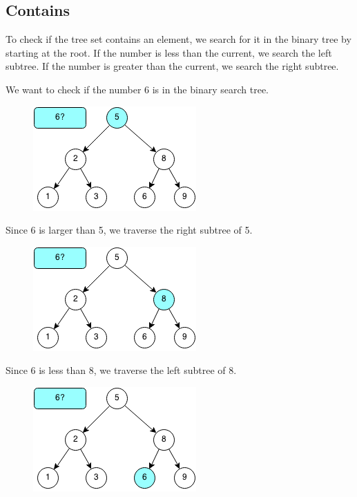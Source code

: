 \documentclass[11pt,oneside]{book}
\makeatletter
\def\maxwidth#1{\ifdim\Gin@nat@width>#1 #1\else\Gin@nat@width\fi}
\makeatother
\begin{document}
\subsection{Contains}

To check if the tree set contains an element, we search for it in the binary tree by starting at the root. If the number is less than the current, we search the left subtree. If the number is greater than the current, we search the right subtree.

We want to check if the number 6 is in the binary search tree.

\vspace{5px}\begin{figure}[H]\centering
        \includegraphics[width=0.66\maxwidth{\textwidth}]{bstcontains.png}
        \end{figure}

Since 6 is larger than 5, we traverse the right subtree of 5.

\vspace{5px}\begin{figure}[H]\centering
        \includegraphics[width=0.66\maxwidth{\textwidth}]{bstcontains2.png}
        \end{figure}

Since 6 is less than 8, we traverse the left subtree of 8.

\vspace{5px}\begin{figure}[H]\centering
        \includegraphics[width=0.66\maxwidth{\textwidth}]{bstcontains3.png}
        \end{figure}
\end{document}
